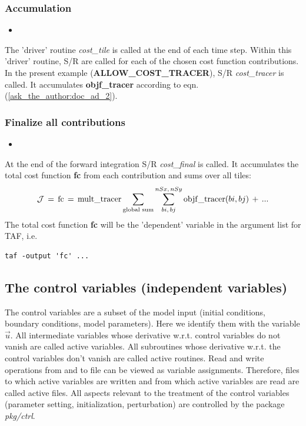 \subsubsection{Accumulation}
%
\begin{itemize}
%
\item 
{}
\end{itemize}
%
The 'driver' routine
{\it cost\_tile} is called at the end of each time step.
Within this 'driver' routine, S/R are called for each of
the chosen cost function contributions.
In the present example ({\bf ALLOW\_COST\_TRACER}),
S/R {\it cost\_tracer} is called.
It accumulates {\bf objf\_tracer} according to eqn. (\ref{ask_the_author:doc_ad_2}).
%
\subsubsection{Finalize all contributions}
%
\begin{itemize}
%
\item 
{}
\end{itemize}
%
At the end of the forward integration S/R {\it cost\_final}
is called. It accumulates the total cost function {\bf fc}
from each contribution and sums over all tiles:
\begin{equation}
{\cal J} \, = \, 
{\rm fc} \, = \, 
{\rm mult\_tracer} \sum_{\text{global sum}} \sum_{bi,\,bj}^{nSx,\,nSy}
{\rm objf\_tracer}(bi,bj) \, + \, ...
\end{equation}
%
The total cost function {\bf fc} will be the
'dependent' variable in the argument list for TAF, i.e.
\begin{verbatim}
taf -output 'fc' ...
\end{verbatim}




\subsection{The control variables (independent variables)
\label{section_ctrl}}

The control variables are a subset of the model input
(initial conditions, boundary conditions, model parameters).
Here we identify them with the variable $ \vec{u} $.
All intermediate variables whose derivative w.r.t. control
variables do not vanish are called {\sf active variables}.
All subroutines whose derivative w.r.t. the control variables
don't vanish are called {\sf active routines}.
Read and write operations from and to file can be viewed
as variable assignments. Therefore, files to which
active variables are written and from which active variables
are read are called {\sf active files}.
All aspects relevant to the treatment of the control variables
(parameter setting, initialization, perturbation)
are controlled by the package {\it pkg/ctrl}.

